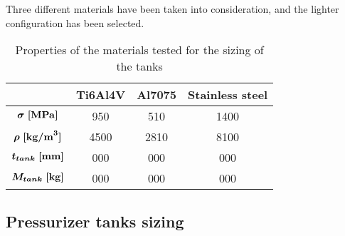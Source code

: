 Three different materials have been taken into consideration, and the lighter configuration has been selected.

\begin{table}[H]
    \renewcommand{\arraystretch}{1.3}
    \centering
    \begin{tabular}{|c|c|c|c|}
        \hline
        & \textbf{Ti6Al4V} & \textbf{Al7075} & \textbf{Stainless steel} \\
        \hline
        $\boldsymbol{\sigma \; [\textrm{\textbf{MPa}}]}$ &
        950 & 510 & 1400 \\
        \hline
        $\boldsymbol{\rho \; [\textrm{\textbf{kg/m}}^3]}$ &
        4500 & 2810 & 8100 \\
        \hline
        \hline
        $\boldsymbol{t_{tank} \; [\textrm{\textbf{mm}}]}$ &
        000 & 000 & 000 \\
        \hline
        $\boldsymbol{M_{tank} \; [\textrm{\textbf{kg}}]}$ &
        \cellcolor{bluePoli!25}000 & 000 & 000 \\
        \hline
    \end{tabular}
    \caption{Properties of the materials tested for the sizing of the tanks}
    \label{table:materials}
\end{table}

\subsection{Pressurizer tanks sizing}
\label{subsec:helium_sizing}

